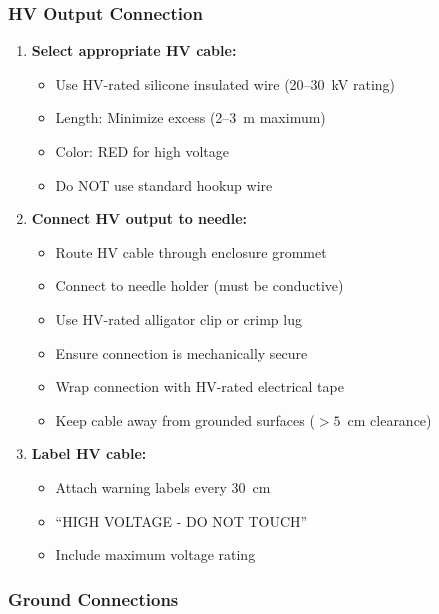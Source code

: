 \documentclass[11pt]{article}
\begin{document}
\subsubsection{HV Output Connection}

\begin{enumerate}
\item \textbf{Select appropriate HV cable:}
  \begin{itemize}
  \item Use HV-rated silicone insulated wire (20--30~kV rating)
  \item Length: Minimize excess (2--3~m maximum)
  \item Color: RED for high voltage
  \item Do NOT use standard hookup wire
  \end{itemize}

\item \textbf{Connect HV output to needle:}
  \begin{itemize}
  \item Route HV cable through enclosure grommet
  \item Connect to needle holder (must be conductive)
  \item Use HV-rated alligator clip or crimp lug
  \item Ensure connection is mechanically secure
  \item Wrap connection with HV-rated electrical tape
  \item Keep cable away from grounded surfaces ($>5$~cm clearance)
  \end{itemize}

\item \textbf{Label HV cable:}
  \begin{itemize}
  \item Attach warning labels every 30~cm
  \item ``HIGH VOLTAGE - DO NOT TOUCH''
  \item Include maximum voltage rating
  \end{itemize}
\end{enumerate}

\subsubsection{Ground Connections}
\end{document}
